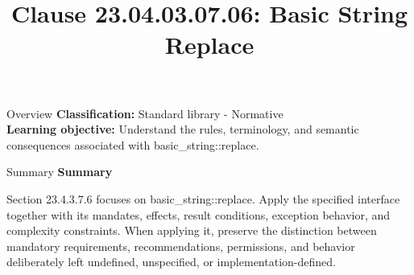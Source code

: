 \documentclass[10pt,letterpaper]{article}
\title{Clause 23.04.03.07.06: Basic String Replace}
\author{}
\date{}
\begin{document}
\maketitle
\begin{CornellOverviewBox}{Overview}
\textbf{Classification:} Standard library - Normative\\[2pt]
\textbf{Learning objective:} Understand the rules, terminology, and semantic consequences associated with basic\_string::replace.
\end{CornellOverviewBox}\begin{CornellSummaryBox}{Summary}
{\sffamily\bfseries\color{Accent} Summary}\par\vspace{3pt}Section 23.4.3.7.6 focuses on basic\_string::replace. Apply the specified interface together with its mandates, effects, result conditions, exception behavior, and complexity constraints. When applying it, preserve the distinction between mandatory requirements, recommendations, permissions, and behavior deliberately left undefined, unspecified, or implementation-defined.
\end{CornellSummaryBox}
\end{document}
